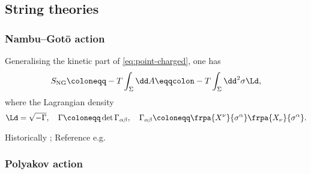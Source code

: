 \documentclass[a4paper,11pt]{article}
\begin{document}





\subsection{String theories}

\subsubsection*{Nambu--Gotō action}

Generalising the kinetic part of \eqref{eq:point-charged}, one has
\begin{equation}
S_\text{NG} \coloneqq -T \int_\Sigma \dd A
\eqqcolon -T \int_\Sigma\dd^2\sigma \Ld,
\end{equation}
where the Lagrangian density
\begin{equation}
\Ld = \sqrt{-\Gamma},\quad
\Gamma \coloneqq \det \Gamma_{\alpha\beta},\quad
\Gamma_{\alpha\beta} \coloneqq \frpa{X^\nu}{\sigma^\alpha} 
\frpa{X_\nu}{\sigma^\alpha}.
\end{equation}


Historically \cite{Goto1971,Nambu1970}; Reference e.g.\ 
\cite{Blumenhagen2013,Kiefer2012}

\subsubsection*{Polyakov action}
\end{document}
